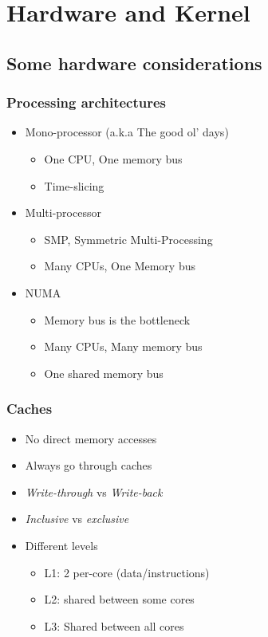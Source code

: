\section{Hardware and Kernel}
\label{sec:kernel}

\subsection{Some hardware considerations}
\label{subsec:more_hard}



\begin{frame}
  \frametitle{Processing architectures}

  \begin{itemize}
  \item Mono-processor (a.k.a The good ol' days)
    \begin{itemize}
    \item One CPU, One memory bus
    \item Time-slicing
    \end{itemize}
  \item Multi-processor
    \begin{itemize}
    \item SMP, Symmetric Multi-Processing
    \item Many CPUs, One Memory bus
    \end{itemize}
  \item NUMA
    \begin{itemize}
    \item Memory bus is the bottleneck
    \item Many CPUs, Many memory bus
    \item One shared memory bus
    \end{itemize}
  \end{itemize}
\end{frame}


\begin{frame}
  \frametitle{Caches}

  \begin{itemize}
  \item No direct memory accesses
  \item Always go through caches
  \item \emph{Write-through} vs \emph{Write-back}
  \item \emph{Inclusive} vs \emph{exclusive}
  \item Different levels
    \begin{itemize}
    \item L1: 2 per-core (data/instructions)
    \item L2: shared between some cores
    \item L3: Shared between all cores
    \end{itemize}
  \end{itemize}
\end{frame}


